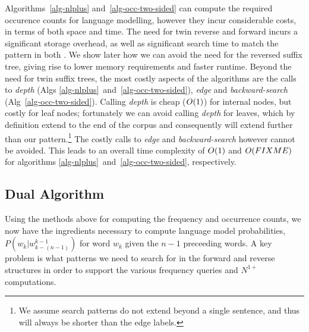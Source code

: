 Algorithms~\ref{alg-nlplus} and~\ref{alg-occ-two-sided} can compute the required occurence counts for \ngram language modelling, however they incur considerable costs, in terms of both space and time. 
The need for twin reverse and forward \CSTs incurs a significant storage overhead, as well as significant search time to match the pattern in both \CSTs. 
We show later how we can avoid the need for the reversed suffix  tree, giving rise to lower memory requirements and faster runtime. 
Beyond the need for twin suffix trees, the most costly aspects of the algorithms are the calls to \emph{depth} (Algs \ref{alg-nlplus}~and~\ref{alg-occ-two-sided}), \emph{edge} and \emph{backward-search} (Alg~\ref{alg-occ-two-sided}).
Calling \emph{depth} is cheap ($O(1)$) for internal nodes, but costly for leaf nodes; fortunately we can avoid calling \emph{depth} for leaves, which by definition extend to the end of the corpus and consequently will extend further than our pattern.\footnote{We assume search patterns do not extend beyond a single sentence, and thus will always be shorter than the edge labels.}
The costly calls to \emph{edge} and \emph{backward-search} however cannot be avoided.
This leads to an overall time complexity of $O(1)$ and $O(FIXME)$ for algorithms \ref{alg-nlplus}~and~\ref{alg-occ-two-sided}, respectively.

\subsection{Dual \CST Algorithm} 

Using the methods above for computing the frequency and occurrence
counts, we now have the ingredients necessary to compute \ngram language model
probabilities, $P(w_k | w^{k-1}_{k-(n-1)})$ for word $w_k$ given the $n-1$
preceeding words. A key problem is what patterns we need to search for
in the forward and reverse \CST structures in order to support the
various frequency queries and $N^{1+}$ computations. 

